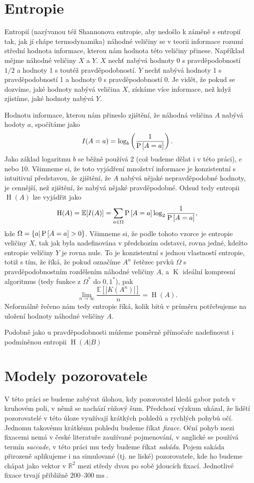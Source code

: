\section{Entropie}

Entropií (nazývanou též Shannonova entropie, aby nedošlo k záměně s entropií
tak, jak jí chápe termodynamika) náhodné veličiny se v teorii informace rozumí
střední hodnota informace, kterou nám hodnota této veličiny přinese. Například
mějme náhodné veličiny $X$ a $Y$. $X$ nechť nabývá hodnoty 0 s pravděpodobností
$1/2$ a hodnoty 1 s toutéž pravděpodobností. $Y$ nechť nabývá hodnoty 1 s
pravděpodobností 1 a hodnoty 0 s pravděpodobností 0. Je vidět, že pokud se
dozvíme, jaké hodnoty nabývá veličina $X$, získáme více informace, než když
zjistíme, jaké hodnoty nabývá $Y$.
\def\H{\operatorname{H}}

Hodnotu informace, kterou nám přineslo zjištění, že náhodná veličina $A$ nabývá
hodoty $a$, spočítáme jako $$I(A=a)=\log_b\left(\frac1{\P{A=a}}\right).$$ Jako
základ logaritmu $b$ se běžně používá 2 (což budeme dělat i v této práci), $e$
nebo 10. Všimneme si, že toto vyjádření množství informace je konzistentní s
intuitivní představou, že zjištění, že $A$ nabývá nějaké nepravděpodobné
hodnoty, je cennější, než zjištění, že nabývá nějaké pravděpodobné. Odsud tedy
entropii $\H(A)$ lze vyjádřit jako $$\H(A)=\mathbb{E}[I(A)]=\displaystyle\sum_{a
\in \Omega}\P{A=a}\log_2\frac1{\P{A=a}},$$ kde $\Omega = \{a|\P{A=a} > 0\}$.
Všimneme si, že podle tohoto vzorce je entropie veličiny $X$, tak jak byla
nadefinována v předchozím odstavci, rovna jedné, kdežto  entropie veličiny $Y$
je rovna nule. To je konzistentní s jednou vlastností entropie, totiž s tím, že
říká, že pokud označíme $A^n$ řetězec prvků $\Omega$ s pravděpodobnostním
rozdělením náhodné veličiny $A$, a $\operatorname K$ ideální kompresní
algoritmus (tedy funkce z $\Omega^*$ do ${0,1}^*$), pak
$$\operatorname{lim}_{n\rightarrow\infty} \frac{\mathbb{E}[|K(A^n)|]}{n} =
\H(A).$$ Neformálně řečeno nám tedy entropie říká, kolik bitů v průměru
potřebujeme na uložení hodnoty náhodné veličiny $A$.

Podobně jako u pravděpodobnosti můžeme poměrně přímočaře nadefinovat i   
podmíněnou entropii $\H(A| B)$

\section{Modely pozorovatele}

V této práci se budeme zabývat úlohou, kdy pozorovatel hledá gabor patch v
kruhovém poli, v němž se nachází růžový šum. Předchozí výzkum ukázal, že lidští
pozorovatelé v této úloze využívají krátkých pohledů a rychlých pohybů očí.
Jednomu takovému krátkému pohledu budeme říkat {\it fixace}. Oční pohyb mezi
fixacemi nemá v české literatuře zaužívané pojmenování, v anglické se používá
termín {\it saccade}, v této práci mu tedy budeme říkat {\it sakáda}. Pojem
sakáda přirozeně aplikujeme i na simulované (tj. ne liské) pozorovatele, kde ho
budeme chápat jako vektor v $\mathbb{R}^2$ mezi středy dvou po sobě jdoucích
fixací. Jednotlivé fixace trvají přibližně $200$--$300 \operatorname{ms}$.


